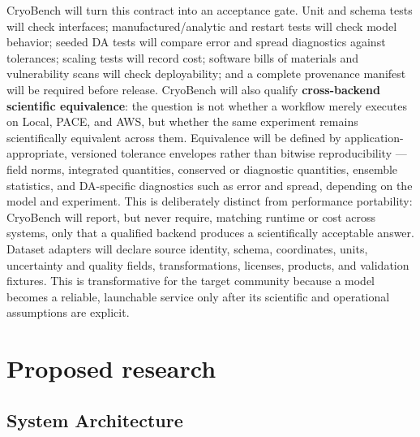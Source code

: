 CryoBench will turn this contract into an acceptance gate. Unit and schema
tests will check interfaces; manufactured/analytic and restart tests will
check model behavior; seeded DA tests will compare error and spread
diagnostics against tolerances; scaling tests will record cost; software bills
of materials and vulnerability scans will check deployability; and a complete
provenance manifest will be required before release. CryoBench will also
qualify \textbf{cross-backend scientific equivalence}: the question is not
whether a workflow merely executes on Local, PACE, and AWS, but whether the
same experiment remains scientifically equivalent across them. Equivalence
will be defined by application-appropriate, versioned tolerance envelopes
rather than bitwise reproducibility --- field norms, integrated quantities,
conserved or diagnostic quantities, ensemble statistics, and DA-specific
diagnostics such as error and spread, depending on the model and experiment.
This is deliberately distinct from performance portability: CryoBench will
report, but never require, matching runtime or cost across systems, only that
a qualified backend produces a scientifically acceptable answer. Dataset
adapters will declare source identity, schema, coordinates, units, uncertainty
and quality fields, transformations, licenses, products, and validation
fixtures. This is transformative for the target community because a model
becomes a reliable, launchable
service only after its scientific and operational assumptions are explicit.

\section{Proposed research}
\label{sec:research}

\subsection{System Architecture}

